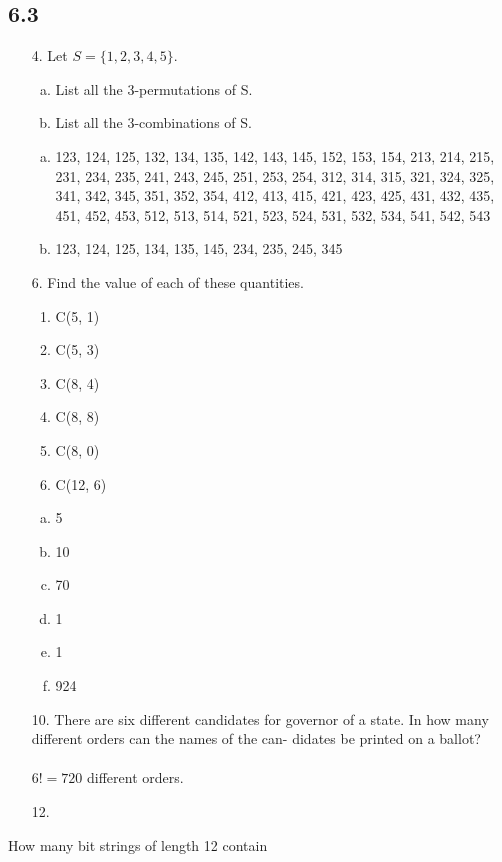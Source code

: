 \subsection{6.3}
\begin{itemize}
    \item[4.]Let $S = \{1, 2, 3, 4, 5\}$.
          \begin{enumerate}[a.]
              \item List all the 3-permutations of S.
              \item List all the 3-combinations of S.
          \end{enumerate}
          \answer
          \begin{enumerate}[a.]
              \item 123, 124, 125, 132, 134, 135, 142, 143, 145, 152, 153, 154,
                    213, 214, 215, 231, 234, 235, 241, 243, 245, 251, 253, 254, 312, 314, 315,
                    321, 324, 325, 341, 342, 345, 351, 352, 354, 412, 413, 415, 421, 423, 425,
                    431, 432, 435, 451, 452, 453, 512, 513, 514, 521, 523, 524, 531, 532, 534,
                    541, 542, 543
              \item 123, 124, 125, 134, 135, 145, 234, 235, 245, 345
          \end{enumerate}

    \item[6.]  Find the value of each of these quantities.
          \begin{enumerate}
              \item C(5, 1)
              \item C(5, 3)
              \item C(8, 4)
              \item C(8, 8)
              \item C(8, 0)
              \item C(12, 6)
          \end{enumerate}
          \answer
          \begin{enumerate}[a.]
              \item 5
              \item 10
              \item 70
              \item 1
              \item 1
              \item 924
          \end{enumerate}

    \item[10.]  There are six different candidates for governor of a state.
          In how many different orders can the names of the can-
          didates be printed on a ballot? \\
          \answer \\
          $6! = 720$ different orders.

    \item[12.]
\end{itemize}  How many bit strings of length 12 contain
